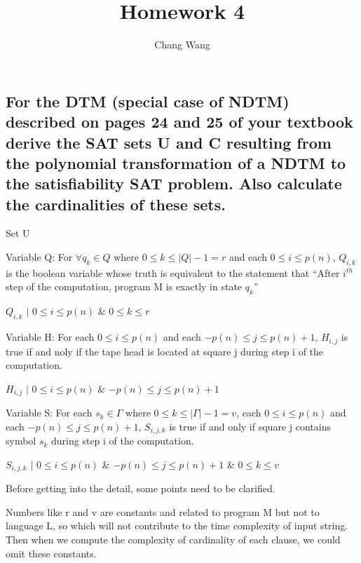 \documentclass[12pt,a4paper]{report}
\title{Homework 4}
\author{Chang Wang}
\begin{document}
\maketitle

\section{}
\subsection{For the DTM (special case of NDTM) described on pages 24 and 25 of your textbook derive the SAT sets U and C resulting from the polynomial transformation of a NDTM to the satisfiability SAT problem. Also calculate the cardinalities of these sets.}

\begin{center}
Set U
\end{center}

Variable Q: For $\forall q_{k} \in Q$ where $0 \le k \le |Q| - 1 = r$ and each $0 \le i \le p(n)$, $Q_{i,k}$ is the boolean variable whose truth is equivalent to the statement that ``After $i^{th}$ step of the computation, program M is exactly in state $q_{k}$''

\begin{center}
$Q_{i,k}$ $|$ $0 \le i \le p(n)$ \& $0 \le k \le r$
\end{center}

Variable H: For each $0 \le i \le p(n)$ and each $-p(n) \le j \le p(n)+1$, $H_{i,j}$ is true if and noly if the tape head 
is located at square j during step i of the computation.

\begin{center}
$H_{i,j}$ $|$ $0 \le i \le p(n)$ \& $-p(n) \le j \le p(n)+1$
\end{center}

Variable S: For each $s_{k} \in \Gamma$ where $0 \le k \le |\Gamma| - 1 = v$, each $0 \le i \le p(n)$ and each $-p(n) \le j \le p(n)+1$, $S_{i,j,k}$ is true if and only if square j contains symbol $s_{k}$ during step i of the computation.

\begin{center}
$S_{i,j,k}$ $|$ $0 \le i \le p(n)$ \& $-p(n) \le j \le p(n)+1$ \& $0 \le k \le v$
\end{center}

Before getting into the detail, some points need to be clarified.

Numbers like r and v are constants and related to program M but not to language L, so which will not contribute to the time complexity of input string. Then when we compute the complexity of cardinality of each clause, we could omit these constants. \\[0.2cm]
\end{document}

